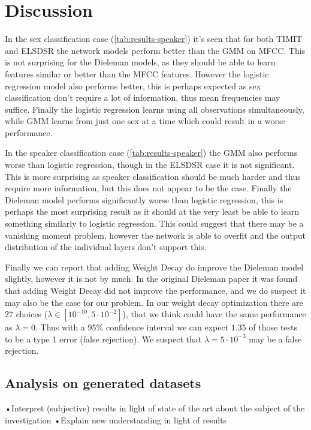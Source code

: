 \section{Discussion}

In the sex classification case (\cref{tab:results-speaker}) it's seen that for both TIMIT and ELSDSR the network models perform better than the GMM on MFCC. This is not surprising for the Dieleman models, as they should be able to learn features similar or better than the MFCC features. However the logistic regression model also performs better, this is perhaps expected as sex classification don't require a lot of information, thus mean frequencies may suffice. Finally the logistic regression learns using all observations simultaneously, while GMM learns from just one sex at a time which could result in a worse performance.

In the speaker classification case (\cref{tab:results-speaker}) the GMM also performs worse than logistic regression, though in the ELSDSR case it is not significant. This is more surprising as speaker classification should be much harder and thus require more information, but this does not appear to be the case. Finally the Dieleman model performs significantly worse than logistic regression, this is perhaps the most surprising result as it should at the very least be able to learn something similarly to logistic regression. This could suggest that there may be a vanishing moment problem, however the network is able to overfit and the output distribution of the individual layers don't support this.

Finally we can report that adding Weight Decay do improve the Dieleman model slightly, however it is not by much. In the original Dieleman paper \cite{dieleman} it was found that adding Weight Decay did not improve the performance, and we do suspect it may also be the case for our problem. In our weight decay optimization there are 27 choices ($\lambda \in [10^{-10}, 5 \cdot 10^{-2}]$), that we think could have the same performance as $\lambda = 0$. Thus with a $95\%$ confidence interval we can expect $1.35$ of those tests to be a type 1 error (false rejection). We suspect that $\lambda = 5 \cdot 10^{-3}$ may be a false rejection.

\subsection{Analysis on generated datasets}


•Interpret (subjective) results in light of state of the art about the subject of
the investigation
•Explain new understanding in light of results
